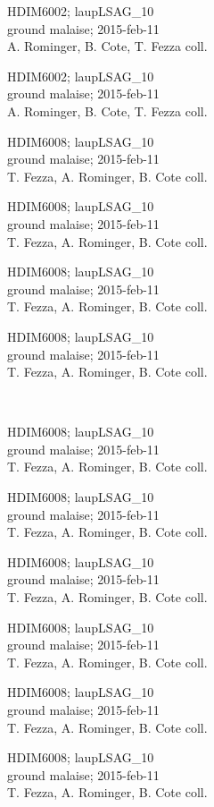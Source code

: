 \documentclass[2pt]{extarticle}
\begin{document}
\noindent
\parbox{0.16\textwidth}{\tiny \raggedright \rule[-0.3\baselineskip]{0pt}{10pt}HDIM6002; laupLSAG\_10\\ ground malaise; 2015-feb-11\\ A. Rominger, B. Cote, T. Fezza coll.}
\parbox{0.16\textwidth}{\tiny \raggedright \rule[-0.3\baselineskip]{0pt}{10pt}HDIM6002; laupLSAG\_10\\ ground malaise; 2015-feb-11\\ A. Rominger, B. Cote, T. Fezza coll.}
\parbox{0.16\textwidth}{\tiny \raggedright \rule[-0.3\baselineskip]{0pt}{10pt}HDIM6008; laupLSAG\_10\\ ground malaise; 2015-feb-11\\ T. Fezza, A. Rominger, B. Cote coll.}
\parbox{0.16\textwidth}{\tiny \raggedright \rule[-0.3\baselineskip]{0pt}{10pt}HDIM6008; laupLSAG\_10\\ ground malaise; 2015-feb-11\\ T. Fezza, A. Rominger, B. Cote coll.}
\parbox{0.16\textwidth}{\tiny \raggedright \rule[-0.3\baselineskip]{0pt}{10pt}HDIM6008; laupLSAG\_10\\ ground malaise; 2015-feb-11\\ T. Fezza, A. Rominger, B. Cote coll.}
\parbox{0.16\textwidth}{\tiny \raggedright \rule[-0.3\baselineskip]{0pt}{10pt}HDIM6008; laupLSAG\_10\\ ground malaise; 2015-feb-11\\ T. Fezza, A. Rominger, B. Cote coll.} \\ 
\vspace{0.001in} 

\noindent
\parbox{0.16\textwidth}{\tiny \raggedright \rule[-0.3\baselineskip]{0pt}{10pt}HDIM6008; laupLSAG\_10\\ ground malaise; 2015-feb-11\\ T. Fezza, A. Rominger, B. Cote coll.}
\parbox{0.16\textwidth}{\tiny \raggedright \rule[-0.3\baselineskip]{0pt}{10pt}HDIM6008; laupLSAG\_10\\ ground malaise; 2015-feb-11\\ T. Fezza, A. Rominger, B. Cote coll.}
\parbox{0.16\textwidth}{\tiny \raggedright \rule[-0.3\baselineskip]{0pt}{10pt}HDIM6008; laupLSAG\_10\\ ground malaise; 2015-feb-11\\ T. Fezza, A. Rominger, B. Cote coll.}
\parbox{0.16\textwidth}{\tiny \raggedright \rule[-0.3\baselineskip]{0pt}{10pt}HDIM6008; laupLSAG\_10\\ ground malaise; 2015-feb-11\\ T. Fezza, A. Rominger, B. Cote coll.}
\parbox{0.16\textwidth}{\tiny \raggedright \rule[-0.3\baselineskip]{0pt}{10pt}HDIM6008; laupLSAG\_10\\ ground malaise; 2015-feb-11\\ T. Fezza, A. Rominger, B. Cote coll.}
\parbox{0.16\textwidth}{\tiny \raggedright \rule[-0.3\baselineskip]{0pt}{10pt}HDIM6008; laupLSAG\_10\\ ground malaise; 2015-feb-11\\ T. Fezza, A. Rominger, B. Cote coll.} \\ 
\vspace{0.001in} 
\end{document}
